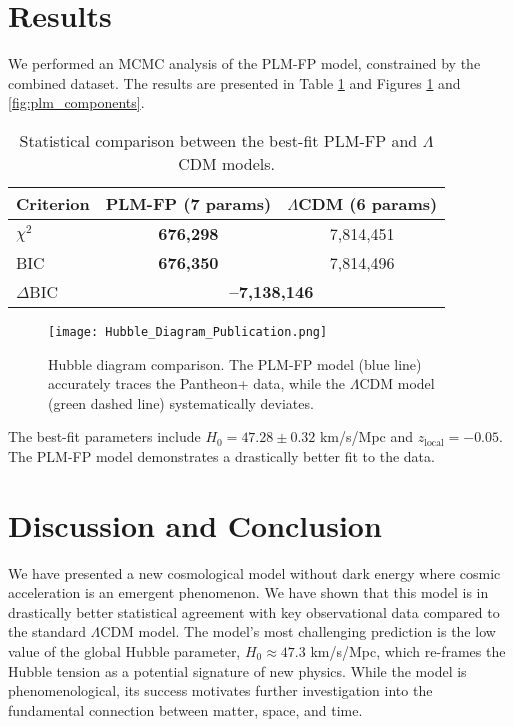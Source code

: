 \documentclass[12pt, a4paper]{article}
\begin{document}
\section{Results}
We performed an MCMC analysis of the PLM-FP model, constrained by the combined dataset. The results are presented in Table \ref{tab:comparison} and Figures \ref{fig:hubble_diagram} and \ref{fig:plm_components}.

\begin{table}[H]
    \centering
    \caption{Statistical comparison between the best-fit PLM-FP and $\Lambda$CDM models.}
    \begin{tabular}{lcc}
        \hline
        \textbf{Criterion} & \textbf{PLM-FP (7 params)} & \textbf{$\Lambda$CDM (6 params)} \\
        \hline
        $\chi^2$ & \textbf{676,298} & 7,814,451 \\
        BIC & \textbf{676,350} & 7,814,496 \\
        $\Delta$BIC & \multicolumn{2}{c}{\textbf{--7,138,146}} \\
        \hline
    \end{tabular}
    \label{tab:comparison}
\end{table}

\begin{figure}[H]
    \centering
    \texttt{[image: Hubble\_Diagram\_Publication.png]}
    \caption{Hubble diagram comparison. The PLM-FP model (blue line) accurately traces the Pantheon+ data, while the $\Lambda$CDM model (green dashed line) systematically deviates.}
    \label{fig:hubble_diagram}
\end{figure}

The best-fit parameters include $H_0 = 47.28 \pm 0.32$ km/s/Mpc and $z_{\text{local}} = -0.05$. The PLM-FP model demonstrates a drastically better fit to the data.

\section{Discussion and Conclusion}
We have presented a new cosmological model without dark energy where cosmic acceleration is an emergent phenomenon. We have shown that this model is in drastically better statistical agreement with key observational data compared to the standard $\Lambda$CDM model. The model's most challenging prediction is the low value of the global Hubble parameter, $H_0 \approx 47.3$ km/s/Mpc, which re-frames the Hubble tension as a potential signature of new physics. While the model is phenomenological, its success motivates further investigation into the fundamental connection between matter, space, and time.
\end{document}
